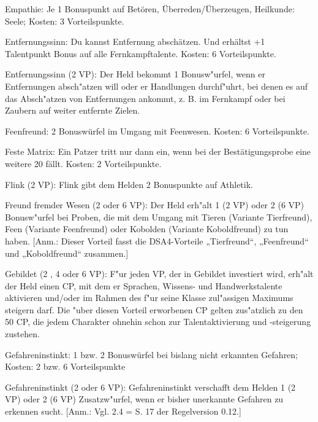 \begin{description}
\item{Empathie:} Je 1 Bonuspunkt auf Betören, Überreden/Überzeugen, Heilkunde: Seele; Kosten: 3 Vorteilspunkte.

\item{Entfernungssinn:} Du kannst Entfernung abschätzen. Und erhältst +1 Talentpunkt Bonus auf alle Fernkampftalente. Kosten: 6 Vorteilspunkte.

\item{Entfernungssinn (2 VP):} Der Held bekommt 1 Bonusw"urfel, wenn er Entfernungen absch"atzen will oder er Handlungen durchf"uhrt, bei denen es auf das Absch"atzen von Entfernungen ankommt, z. B. im Fernkampf oder bei Zaubern auf weiter entfernte Zielen.

\item{Feenfreund:} 2 Bonuswürfel im Umgang mit Feenwesen. Kosten: 6 Vorteilspunkte.

\item{Feste Matrix:} Ein Patzer tritt nur dann ein, wenn bei der Bestätigungsprobe eine weitere 20 fällt. Kosten: 2 Vorteilspunkte.

\item{Flink (2 VP):} Flink gibt dem Helden 2 Bonuspunkte auf Athletik.

\item{Freund fremder Wesen (2 oder 6 VP):} Der Held erh"alt 1 (2 VP) oder 2 (6 VP) Bonusw"urfel bei Proben, die mit dem Umgang mit Tieren (Variante Tierfreund), Feen (Variante Feenfreund) oder Kobolden (Variante Koboldfreund) zu tun haben.
[Anm.: Dieser Vorteil fasst die DSA4-Vorteile „Tierfreund“, „Feenfreund“ und „Koboldfreund“ zusammen.]

\item{Gebildet (2 , 4 oder 6 VP):} F"ur jeden VP, der in Gebildet investiert wird, erh"alt der Held einen CP, mit dem er Sprachen, Wissens- und Handwerkstalente aktivieren und/oder im Rahmen des f"ur seine Klasse zul"assigen Maximums steigern darf. Die "uber diesen Vorteil erworbenen CP gelten zus"atzlich zu den 50 CP, die jedem Charakter ohnehin schon zur Talentaktivierung und -steigerung zustehen.

\item{Gefahreninstinkt:} 1 bzw. 2 Bonuswürfel bei bislang nicht erkannten Gefahren; Kosten: 2 bzw. 6 Vorteilspunkte

\item{Gefahreninstinkt (2 oder 6 VP):} Gefahreninstinkt verschafft dem Helden 1 (2 VP) oder 2 (6 VP) Zusatzw"urfel, wenn er bisher unerkannte Gefahren zu erkennen sucht. [Anm.: Vgl. 2.4 = S. 17 der Regelversion 0.12.]


\end{description}
